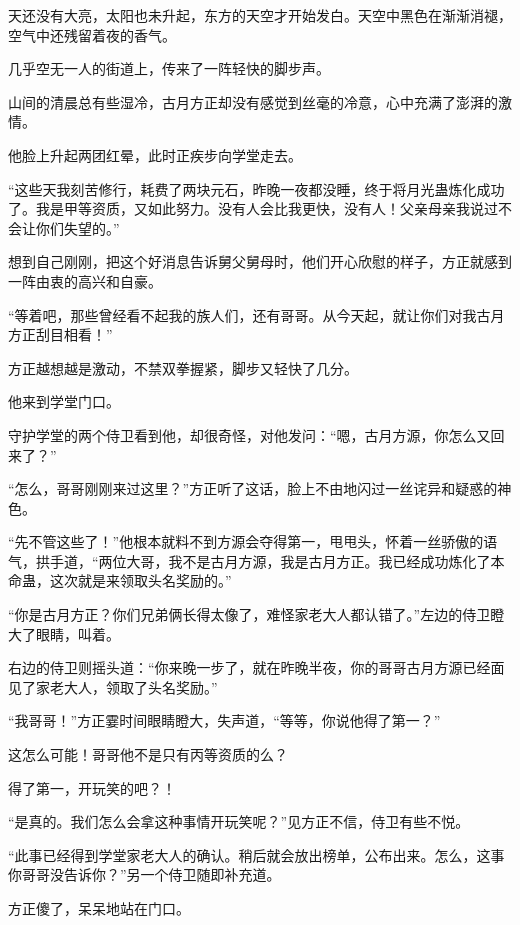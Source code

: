 
\begin{this_body}

天还没有大亮，太阳也未升起，东方的天空才开始发白。天空中黑色在渐渐消褪，空气中还残留着夜的香气。

几乎空无一人的街道上，传来了一阵轻快的脚步声。

山间的清晨总有些湿冷，古月方正却没有感觉到丝毫的冷意，心中充满了澎湃的激情。

他脸上升起两团红晕，此时正疾步向学堂走去。

“这些天我刻苦修行，耗费了两块元石，昨晚一夜都没睡，终于将月光蛊炼化成功了。我是甲等资质，又如此努力。没有人会比我更快，没有人！父亲母亲我说过不会让你们失望的。”

想到自己刚刚，把这个好消息告诉舅父舅母时，他们开心欣慰的样子，方正就感到一阵由衷的高兴和自豪。

“等着吧，那些曾经看不起我的族人们，还有哥哥。从今天起，就让你们对我古月方正刮目相看！”

方正越想越是激动，不禁双拳握紧，脚步又轻快了几分。

他来到学堂门口。

守护学堂的两个侍卫看到他，却很奇怪，对他发问：“嗯，古月方源，你怎么又回来了？”

“怎么，哥哥刚刚来过这里？”方正听了这话，脸上不由地闪过一丝诧异和疑惑的神色。

“先不管这些了！”他根本就料不到方源会夺得第一，甩甩头，怀着一丝骄傲的语气，拱手道，“两位大哥，我不是古月方源，我是古月方正。我已经成功炼化了本命蛊，这次就是来领取头名奖励的。”

“你是古月方正？你们兄弟俩长得太像了，难怪家老大人都认错了。”左边的侍卫瞪大了眼睛，叫着。

右边的侍卫则摇头道：“你来晚一步了，就在昨晚半夜，你的哥哥古月方源已经面见了家老大人，领取了头名奖励。”

“我哥哥！”方正霎时间眼睛瞪大，失声道，“等等，你说他得了第一？”

这怎么可能！哥哥他不是只有丙等资质的么？

得了第一，开玩笑的吧？！

“是真的。我们怎么会拿这种事情开玩笑呢？”见方正不信，侍卫有些不悦。

“此事已经得到学堂家老大人的确认。稍后就会放出榜单，公布出来。怎么，这事你哥哥没告诉你？”另一个侍卫随即补充道。

方正傻了，呆呆地站在门口。


\end{this_body}
